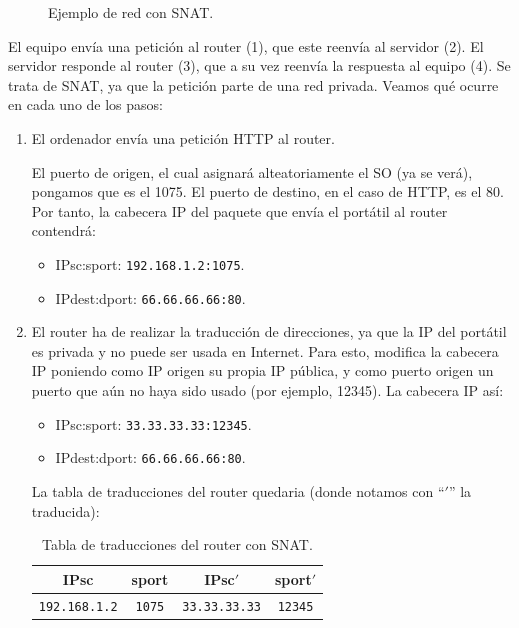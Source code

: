 \begin{ejemplo}
\begin{figure}
\begin{tikzpicture}[node distance=6cm]
        \end{tikzpicture}
        \caption{Ejemplo de red con \acrshort{SNAT}.}
        \label{fig:ejemplo_nat}
    \end{figure}

    El equipo envía una petición al router (1), que este reenvía al servidor (2). El servidor responde al router (3), que a su vez reenvía la respuesta al equipo (4). Se trata de \acrshort{SNAT}, ya que la petición parte de una red privada. Veamos qué ocurre en cada uno de los pasos:
    \begin{enumerate}[label=(\arabic*)]
        \item El ordenador envía una petición \acrshort{HTTP} al router.
        
        El puerto de origen, el cual asignará alteatoriamente el SO (ya se verá), pongamos que es el 1075. El puerto de destino, en el caso de \acrshort{HTTP}, es el 80. Por tanto, la cabecera IP del paquete que envía el portátil al router contendrá:
        \begin{itemize}
            \item {IPsc}:{sport}: \verb|192.168.1.2:1075|.
            \item {IPdest}:{dport}: \verb|66.66.66.66:80|.
        \end{itemize}
            
        \item El router ha de realizar la traducción de direcciones, ya que la IP del portátil es privada y no puede ser usada en Internet. Para esto, modifica la cabecera IP poniendo como IP origen su propia IP pública, y como puerto origen un puerto que aún no haya sido usado (por ejemplo, 12345). La cabecera IP así:
        \begin{itemize}
            \item {IPsc}:{sport}: \verb|33.33.33.33:12345|.
            \item {IPdest}:{dport}: \verb|66.66.66.66:80|.
        \end{itemize}

        La tabla de traducciones del router quedaria (donde notamos con ``$'$'' la traducida):
        \begin{table}[H]
            \centering
            \begin{tabular}{|c|c||c|c|}
                \hline
                IPsc & sport & IPsc$'$ & sport$'$ \\
                \hline
                \verb|192.168.1.2| & \verb|1075| & \verb|33.33.33.33| & \verb|12345|\\
                \hline
            \end{tabular}
            \caption{Tabla de traducciones del router con SNAT.}
            \label{tab:tabla_traducciones}            
        \end{table}


\end{enumerate}
\end{ejemplo}
